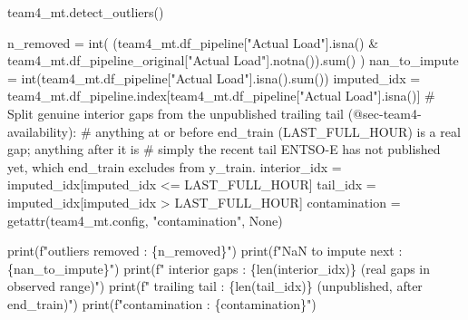 \documentclass[
  english,
  letterpaper,
]{scrbook}
\newenvironment{Shaded}{\begin{snugshade}}{\end{snugshade}}
\newcommand{\BuiltInTok}[1]{\textcolor[rgb]{0.00,0.23,0.31}{#1}}
\newcommand{\CommentTok}[1]{\textcolor[rgb]{0.37,0.37,0.37}{#1}}
\newcommand{\NormalTok}[1]{\textcolor[rgb]{0.00,0.23,0.31}{#1}}
\newcommand{\OperatorTok}[1]{\textcolor[rgb]{0.37,0.37,0.37}{#1}}
\newcommand{\SpecialCharTok}[1]{\textcolor[rgb]{0.37,0.37,0.37}{#1}}
\newcommand{\SpecialStringTok}[1]{\textcolor[rgb]{0.13,0.47,0.30}{#1}}
\newcommand{\StringTok}[1]{\textcolor[rgb]{0.13,0.47,0.30}{#1}}
\newcommand{\VariableTok}[1]{\textcolor[rgb]{0.07,0.07,0.07}{#1}}
\begin{document}
\protect{}\label{team4-detect-outliers}
\begin{Shaded}
\begin{Highlighting}[]
\NormalTok{team4\_mt.detect\_outliers()}

\NormalTok{n\_removed }\OperatorTok{=} \BuiltInTok{int}\NormalTok{(}
\NormalTok{    (team4\_mt.df\_pipeline[}\StringTok{"Actual Load"}\NormalTok{].isna()}
     \OperatorTok{\&}\NormalTok{ team4\_mt.df\_pipeline\_original[}\StringTok{"Actual Load"}\NormalTok{].notna()).}\BuiltInTok{sum}\NormalTok{()}
\NormalTok{)}
\NormalTok{nan\_to\_impute }\OperatorTok{=} \BuiltInTok{int}\NormalTok{(team4\_mt.df\_pipeline[}\StringTok{"Actual Load"}\NormalTok{].isna().}\BuiltInTok{sum}\NormalTok{())}
\NormalTok{imputed\_idx }\OperatorTok{=}\NormalTok{ team4\_mt.df\_pipeline.index[team4\_mt.df\_pipeline[}\StringTok{"Actual Load"}\NormalTok{].isna()]}
\CommentTok{\# Split genuine interior gaps from the unpublished trailing tail (@sec{-}team4{-}availability):}
\CommentTok{\# anything at or before end\_train (LAST\_FULL\_HOUR) is a real gap; anything after it is}
\CommentTok{\# simply the recent tail ENTSO{-}E has not published yet, which end\_train excludes from y\_train.}
\NormalTok{interior\_idx }\OperatorTok{=}\NormalTok{ imputed\_idx[imputed\_idx }\OperatorTok{\textless{}=}\NormalTok{ LAST\_FULL\_HOUR]}
\NormalTok{tail\_idx }\OperatorTok{=}\NormalTok{ imputed\_idx[imputed\_idx }\OperatorTok{\textgreater{}}\NormalTok{ LAST\_FULL\_HOUR]}
\NormalTok{contamination }\OperatorTok{=} \BuiltInTok{getattr}\NormalTok{(team4\_mt.config, }\StringTok{"contamination"}\NormalTok{, }\VariableTok{None}\NormalTok{)}

\BuiltInTok{print}\NormalTok{(}\SpecialStringTok{f"outliers removed   : }\SpecialCharTok{\{}\NormalTok{n\_removed}\SpecialCharTok{\}}\SpecialStringTok{"}\NormalTok{)}
\BuiltInTok{print}\NormalTok{(}\SpecialStringTok{f"NaN to impute next : }\SpecialCharTok{\{}\NormalTok{nan\_to\_impute}\SpecialCharTok{\}}\SpecialStringTok{"}\NormalTok{)}
\BuiltInTok{print}\NormalTok{(}\SpecialStringTok{f"  interior gaps    : }\SpecialCharTok{\{}\BuiltInTok{len}\NormalTok{(interior\_idx)}\SpecialCharTok{\}}\SpecialStringTok{  (real gaps in observed range)"}\NormalTok{)}
\BuiltInTok{print}\NormalTok{(}\SpecialStringTok{f"  trailing tail    : }\SpecialCharTok{\{}\BuiltInTok{len}\NormalTok{(tail\_idx)}\SpecialCharTok{\}}\SpecialStringTok{  (unpublished, after end\_train)"}\NormalTok{)}
\BuiltInTok{print}\NormalTok{(}\SpecialStringTok{f"contamination      : }\SpecialCharTok{\{}\NormalTok{contamination}\SpecialCharTok{\}}\SpecialStringTok{"}\NormalTok{)}
\end{Highlighting}
\end{Shaded}
\end{document}
